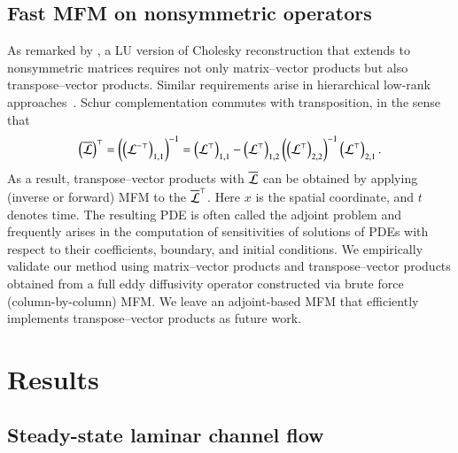 \documentclass[11pt,sort&compress]{elsarticle}
\begin{document}
\subsection{Fast MFM on nonsymmetric operators}\label{s:fmfm}
As remarked by \citet{schaferSparseRecoveryElliptic2021}, a LU version of Cholesky reconstruction that extends to nonsymmetric matrices requires not only matrix--vector products but also transpose--vector products.
Similar requirements arise in hierarchical low-rank approaches~\citep{halko2011finding,lin2011fast}. 
Schur complementation commutes with transposition, in the sense that
\begin{gather}
    \left(\overline{\mathcal{L}}\right)^{\top}
    =
    \left(\left(\mathcal{L}^{-\top}\right)_{1, 1}\right)^{-1}
    =
    \left(\mathcal{L}^{\top}\right)_{1, 1} - \left(\mathcal{L}^{\top}\right)_{1, 2} \left(\left(\mathcal{L}^\top\right)_{2,2}\right)^{-1} \left(\mathcal{L}^\top\right)_{2 ,1} .
    \label{eqn:mfm_schur_transpose}
\end{gather}
As a result, transpose--vector products with $\overline{\mathcal{L}}$ can be obtained by applying (inverse or forward) MFM to the $\overline{\mathcal{L}}^{\top}$.
Here $x$ is the spatial coordinate, and $t$ denotes time.
The resulting PDE is often called the adjoint problem and frequently arises in the computation of sensitivities of solutions of PDEs with respect to their coefficients, boundary, and initial conditions.
We empirically validate our method using matrix--vector products and transpose--vector products obtained from a full eddy diffusivity operator constructed via brute force (column-by-column) MFM. 
We leave an adjoint-based MFM that efficiently implements transpose--vector products as future work.

\section{Results}\label{s:results}

\subsection{Steady-state laminar channel flow}
\end{document}
